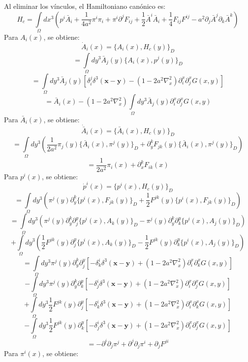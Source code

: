 \documentclass[a4paper,12pt]{article}
\begin{document}
Al eliminar los vínculos, el Hamiltoniano canónico es:
\begin{equation}
H_c=\int\limits_{\Omega}dx^{3}\left(p^{i}\bar{A}_i +\frac{1}{4a^2}\pi^{i}\pi_i+\pi^{i}\partial^j F_{ij}+\frac{1}{2}\bar{A}^i\bar{A}_i+\frac{1}{4} F_{ij}F^{ij}-a^2\partial_j\bar{A}^j\partial_k\bar{A}^k\right) 
\label{hacono}
\end{equation}
Para $A_i(x)$, se obtiene:
\begin{equation}
\dot{A}_i(x)=\{A_i(x),H_c(y)\}_D 
\end{equation}
$$=\int\limits_{\Omega}dy^{3}\bar{A}_j(y)\{A_i(x),p^{j}(y)\}_D$$
$$=\int\limits_{\Omega}dy^{3}\bar{A}_j(y)[\delta^j_i\delta^3(\textbf{x}-\textbf{y})-(1-2a^2\nabla^2_x)\partial_i^x\partial_j^xG(x,y)]$$
$$=\bar{A}_i(x)-(1-2a^2\nabla^2_x)\int\limits_{\Omega}dy^{3}\bar{A}_j(y)\partial_i^x\partial_j^xG(x,y)$$
Para $\bar{A}_i(x)$, se obtiene:
\begin{equation}
\dot{\bar{A}}_i(x)=\{\bar{A}_i(x),H_c(y)\}_D 
\end{equation}
$$=\int\limits_{\Omega}dy^{3}\left(\frac{1}{2a^2}\pi_j(y)\{\bar{A}_i(x),\pi^{j}(y)\}_D+\partial^k_y F_{jk}(y)\{\bar{A}_i(x),\pi^{j}(y)\}_D\right)$$
$$=\frac{1}{2a^2}\pi_i(x)+\partial^k_x F_{ik}(x)$$
Para $p^i(x)$, se obtiene:
\begin{equation}
\dot{p}^i(x)=\{p^i(x),H_c(y)\}_D 
\end{equation}
$$=\int\limits_{\Omega}dy^{3}\left(\pi^{j}(y)\partial^k_y \{p^i(x),F_{jk}(y)\}_D+\frac{1}{2}F^{jk}(y)\{p^i(x),F_{jk}(y)\}_D\right)$$
$$=\int\limits_{\Omega}dy^{3}\left(\pi^{j}(y)\partial^k_y\partial_j^y \{p^i(x),A_{k}(y)\}_D-\pi^{j}(y)\partial^k_y\partial_k^y \{p^i(x),A_{j}(y)\}_D\right)$$
$$+\int\limits_{\Omega}dy^{3}\left(\frac{1}{2}F^{jk}(y) \partial_j^y\{p^i(x),A_{k}(y)\}_D-\frac{1}{2}F^{jk}(y)\partial_k^y\{p^i(x),A_{j}(y)\}_D\right)$$
$$=\int\limits_{\Omega}dy^{3}\pi^{j}(y)\partial^k_y\partial_j^y[-\delta_k^i\delta^3(\textbf{x}-\textbf{y})+(1-2a^2\nabla^2_x)\partial_i^x\partial_k^xG(x,y)]$$
$$-\int\limits_{\Omega}dy^{3}\pi^{j}(y)\partial^k_y\partial_k^y[-\delta_j^i\delta^3(\textbf{x}-\textbf{y})+(1-2a^2\nabla^2_x)\partial_i^x\partial_j^xG(x,y)]$$
$$+\int\limits_{\Omega}dy^{3}\frac{1}{2}F^{jk}(y) \partial_j^y[-\delta_k^i\delta^3(\textbf{x}-\textbf{y})+(1-2a^2\nabla^2_x)\partial_i^x\partial_k^xG(x,y)]$$
$$-\int\limits_{\Omega}dy^{3}\frac{1}{2}F^{jk}(y) \partial_k^y[-\delta_j^i\delta^3(\textbf{x}-\textbf{y})+(1-2a^2\nabla^2_x)\partial_i^x\partial_j^xG(x,y)]$$
$$=-\partial^i\partial_j\pi^{j}+\partial^j\partial_j\pi^{i}+\partial_jF^{ji}$$
Para $\pi^i(x)$, se obtiene:
\end{document}

